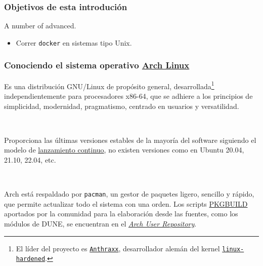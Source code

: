 




\begin{frame}
  \frametitle{Objetivos de esta introdución}
  A number of advanced.
  \begin{itemize}
    \item Correr \lstinline{docker} en sistemas tipo Unix.
  \end{itemize}
\end{frame}

\begin{frame}
  \frametitle{Conociendo el sistema operativo \href{https://archlinux.org}{Arch Linux}}

  Es una distribución GNU/Linux de propósito general, desarrollada\footnote{El líder del proyecto es \href{https://wiki.archlinux.org/title/User:Anthraxx}{\texttt{Anthraxx}}, desarrollador alemán del kernel \href{https://github.com/anthraxx/linux-hardened}{\texttt{linux-hardened}}.} independientemente para procesadores x86-64, que se adhiere a los principios de simplicidad, modernidad, pragmatismo, centrado en usuarios y versatilidad.

  \

  Proporciona las últimas versiones estables de la mayoría del software siguiendo el modelo de \href{https://en.wikipedia.org/wiki/Rolling\_release}{lanzamiento continuo}, no existen versiones como en Ubuntu 20.04, 21.10, 22.04, etc.

  \

  Arch está respaldado por \lstinline{pacman}, un gestor de paquetes ligero, sencillo y rápido, que permite actualizar todo el sistema con una orden.
  Los scripts \href{https://wiki.archlinux.org/title/PKGBUILD}{PKGBUILD} aportados por la comunidad para la elaboración desde las fuentes, como los módulos de DUNE, se encuentran en el \href{http://aur.archlinux.org}{\emph{Arch User Repository}}.


\end{frame}
